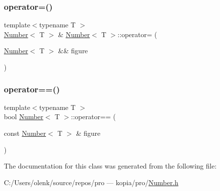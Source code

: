\subsubsection{\texorpdfstring{operator=()}{operator=()}}
{\footnotesize\ttfamily template$<$typename T $>$ \\
\mbox{\hyperlink{class_number}{Number}}$<$ T $>$ \& \mbox{\hyperlink{class_number}{Number}}$<$ T $>$\+::operator= (\begin{DoxyParamCaption}\item[{\mbox{\hyperlink{class_number}{Number}}$<$ T $>$ \&\&}]{figure }\end{DoxyParamCaption})\hspace{0.3cm}{\ttfamily [inline]}}

\mbox{\label{class_number_ad421798cff9c32a4698ccc41bf01643e}} 
\subsubsection{\texorpdfstring{operator==()}{operator==()}}
{\footnotesize\ttfamily template$<$typename T $>$ \\
bool \mbox{\hyperlink{class_number}{Number}}$<$ T $>$\+::operator== (\begin{DoxyParamCaption}\item[{const \mbox{\hyperlink{class_number}{Number}}$<$ T $>$ \&}]{figure }\end{DoxyParamCaption})}



The documentation for this class was generated from the following file\+:\begin{DoxyCompactItemize}
\item 
C\+:/\+Users/olenk/source/repos/pro — kopia/pro/\mbox{\hyperlink{_number_8h}{Number.\+h}}\end{DoxyCompactItemize}
